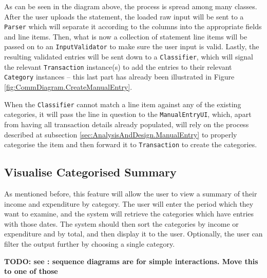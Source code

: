 As can be seen in the diagram above, the process is spread among many classes.
After the user uploads the statement, the loaded raw input will be sent to a
\texttt{Parser} which will separate it according to the columns into the
appropriate fields and line items. Then, what is now a collection of statement
line items will be passed on to an \texttt{InputValidator} to make sure the user
input is valid. Lastly, the resulting validated entries will be sent down to a
\texttt{Classifier}, which will signal the relevant \texttt{Transaction}
instance(s) to add the entries to their relevant \texttt{Category} instances --
this last part has already been illustrated in Figure
\ref{fig:CommDiagram.CreateManualEntry}. 

When the \texttt{Classifier} cannot match a line item against any of the existing
categories, it will pass the line in question to the \texttt{ManualEntryUI},
which, apart from having all transaction details already populated, will rely
on the process described at subsection \ref{sec:AnalysisAndDesign.ManualEntry}
to properly categorise the item and then forward it to \texttt{Transaction} to
create the categories.

\subsection{Visualise Categorised Summary} \label{sec:AnalysisAndDesign.ViewSummary}
As mentioned before, this feature will allow the user to view a summary of
their income and expenditure by category.  The user will enter the period which
they want to examine, and the system will retrieve the categories which have
entries with those dates.  The system should then sort the categories by income
or expenditure and by total, and then display it to the user. Optionally, the
user can filter the output further by choosing a single category.

\textbf{TODO: see \cite[][p.~262]{bennett2010object}: sequence diagrams are for simple
interactions. Move this to one of those}

